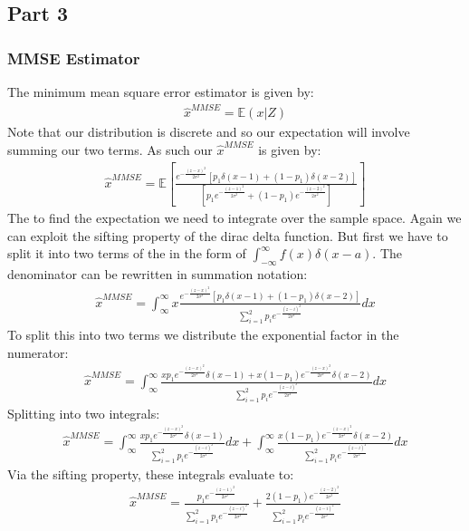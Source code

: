 \documentclass{article}
\begin{document}
\subsection*{Part 3}
\subsubsection*{MMSE Estimator}
The minimum mean square error estimator is given by:
\begin{align*}
\hat{x}^{MMSE} = \mathbb{E}(x|Z)
\end{align*}
Note that our distribution is discrete and so our expectation will involve summing our two terms. As such our $\hat{x}^{MMSE}$ is given by:
\begin{align*}
\hat{x}^{MMSE} = \mathbb{E}[ \frac{ e^{-\tfrac{(z-x)^2}{2\sigma^2}} [p_1 \delta(x-1) + (1-p_1) \delta(x-2)]}{[p_1 e^{-\tfrac{(z-1)^2}{2\sigma^2}} + (1-p_1) e^{-\tfrac{(z-2)^2}{2\sigma^2}}]} ]
\end{align*}
The to find the expectation we need to integrate over the sample space. Again we can exploit the sifting property of the dirac delta function. But first we have to split it into two terms of the in the form of $\int_{-\infty}^{\infty}f(x)\delta(x-a)$. The denominator can be rewritten in summation notation:
\begin{align*}
\hat{x}^{MMSE} = \int_{\infty}^{\infty} x \frac{ e^{-\tfrac{(z-x)^2}{2\sigma^2}} [p_1 \delta(x-1) + (1-p_1) \delta(x-2)]}{ \sum_{i=1}^{2}p_i e^{-\tfrac{(z-i)^2}{2\sigma^2}} } dx
\end{align*}
To split this into two terms we distribute the exponential factor in the numerator:
\begin{align*}
\hat{x}^{MMSE} = \int_{\infty}^{\infty} \frac{ xp_1 e^{-\tfrac{(z-x)^2}{2\sigma^2}} \delta(x-1) + x(1-p_1) e^{-\tfrac{(z-x)^2}{2\sigma^2}} \delta(x-2)}{ \sum_{i=1}^{2}p_i e^{-\tfrac{(z-i)^2}{2\sigma^2}} } dx
\end{align*}
Splitting into two integrals:
\begin{align*}
\hat{x}^{MMSE} = \int_{\infty}^{\infty} \frac{ x p_1 e^{-\tfrac{(z-x)^2}{2\sigma^2}} \delta(x-1)}{ \sum_{i=1}^{2}p_i e^{-\tfrac{(z-i)^2}{2\sigma^2}} } dx + \int_{\infty}^{\infty} \frac{ x(1-p_1) e^{-\tfrac{(z-x)^2}{2\sigma^2}} \delta(x-2)}{ \sum_{i=1}^{2}p_i e^{-\tfrac{(z-i)^2}{2\sigma^2}} } dx 
\end{align*}
Via the sifting property, these integrals evaluate to:
\begin{align*}
\hat{x}^{MMSE} =  \frac{ p_1 e^{-\tfrac{(z-1)^2}{2\sigma^2}}}{ \sum_{i=1}^{2}p_i e^{-\tfrac{(z-i)^2}{2\sigma^2}} }  + \frac{ 2(1-p_1) e^{-\tfrac{(z-2)^2}{2\sigma^2}}}{ \sum_{i=1}^{2}p_i e^{-\tfrac{(z-i)^2}{2\sigma^2}} }
\end{align*}
\end{document}
